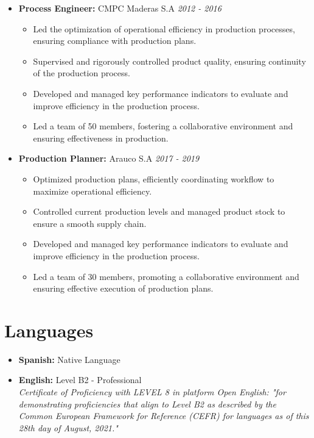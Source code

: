 \documentclass[a4paper,10pt]{article}
\begin{document}
\begin{itemize}[left=0pt]
		\item \textbf{\large Process Engineer:} CMPC Maderas S.A \hfill \textit{2012 - 2016} 
		\begin{itemize}[left=10pt, topsep=0pt]
			\item Led the optimization of operational efficiency in production processes, ensuring compliance with production plans.
			\item Supervised and rigorously controlled product quality, ensuring continuity of the production process.
			\item Developed and managed key performance indicators to evaluate and improve efficiency in the production process.
			\item Led a team of 50 members, fostering a collaborative environment and ensuring effectiveness in production.
		\end{itemize}
		
		\item \textbf{\large Production Planner:} Arauco S.A \hfill \textit{2017 - 2019} 
		\begin{itemize}[left=10pt, topsep=0pt]
			\item Optimized production plans, efficiently coordinating workflow to maximize operational efficiency.
			\item Controlled current production levels and managed product stock to ensure a smooth supply chain.
			\item Developed and managed key performance indicators to evaluate and improve efficiency in the production process.
			\item Led a team of 30 members, promoting a collaborative environment and ensuring effective execution of production plans.
		\end{itemize}
	\end{itemize}
	

	
\section*{Languages}
		\begin{itemize}
		\item \textbf{Spanish:} Native Language
		\item \textbf{English:} Level B2 - Professional\\
		\textit{Certificate of Proficiency with LEVEL 8 in platform Open English: "for demonstrating proficiencies that align to Level B2 as described by the Common European Framework for Reference (CEFR) for languages as of this 28th day of August, 2021."}
		
	\end{itemize}
	
	
\end{document}
